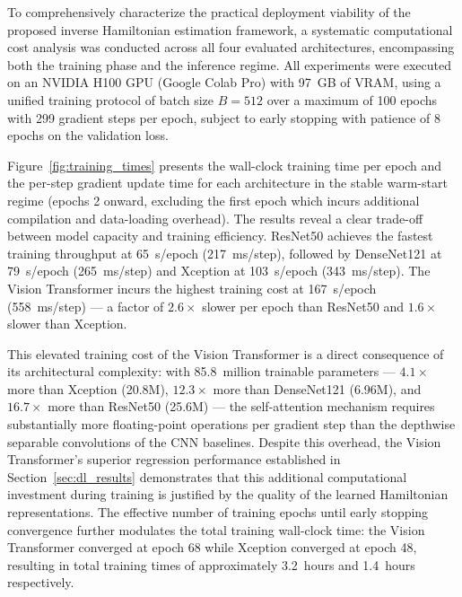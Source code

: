 \documentclass[final,5p,times,twocolumn]{elsarticle}
\begin{document}
To comprehensively characterize the practical deployment 
viability of the proposed inverse Hamiltonian estimation 
framework, a systematic computational cost analysis was 
conducted across all four evaluated architectures, 
encompassing both the training phase and the inference 
regime. All experiments were executed on an NVIDIA H100 
GPU (Google Colab Pro) with 97~GB of VRAM, using a unified
training protocol of batch size $B=512$ over a maximum of 
100 epochs with 299 gradient steps per epoch, subject to 
early stopping with patience of 8 epochs on the validation 
loss.


Figure~\ref{fig:training_times} presents the wall-clock 
training time per epoch and the per-step gradient update 
time for each architecture in the stable warm-start regime 
(epochs 2 onward, excluding the first epoch which incurs 
additional compilation and data-loading overhead). The 
results reveal a clear trade-off between model capacity 
and training efficiency. ResNet50 achieves the fastest 
training throughput at 65~s/epoch (217~ms/step), followed 
by DenseNet121 at 79~s/epoch (265~ms/step) and Xception 
at 103~s/epoch (343~ms/step). The Vision Transformer 
incurs the highest training cost at 167~s/epoch 
(558~ms/step) --- a factor of $2.6\times$ slower per 
epoch than ResNet50 and $1.6\times$ slower than Xception.

This elevated training cost of the Vision Transformer 
is a direct consequence of its architectural complexity: 
with 85.8~million trainable parameters --- $4.1\times$ 
more than Xception (20.8M), $12.3\times$ more than 
DenseNet121 (6.96M), and $16.7\times$ more than 
ResNet50 (25.6M) --- the self-attention mechanism 
requires substantially more floating-point operations per 
gradient step than the depthwise separable convolutions 
of the CNN baselines. Despite this overhead, the Vision 
Transformer's superior regression performance 
established in Section~\ref{sec:dl_results} demonstrates 
that this additional computational investment during 
training is justified by the quality of the learned 
Hamiltonian representations. The effective number of 
training epochs until early stopping convergence further 
modulates the total training wall-clock time: the Vision 
Transformer converged at epoch 68 while Xception 
converged at epoch 48, resulting in total training 
times of approximately 3.2~hours and 1.4~hours 
respectively.
\end{document}

